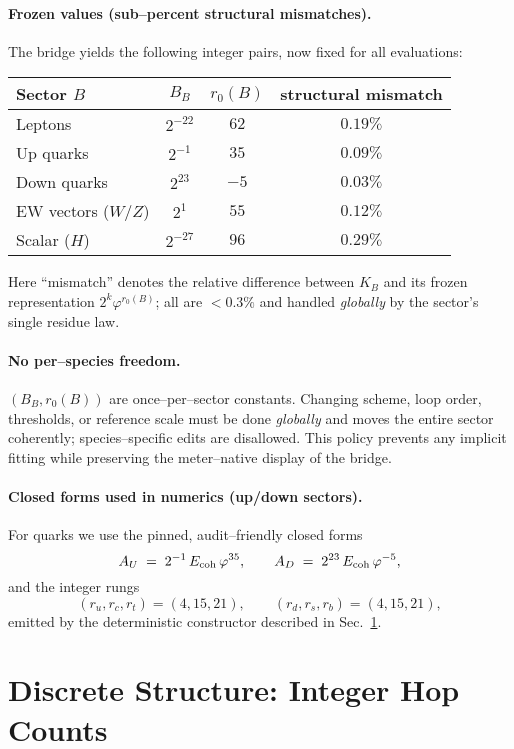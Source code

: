 \documentclass[epjc3]{svjour3}
\begin{document}
\paragraph{Frozen values (sub–percent structural mismatches).}
The bridge yields the following integer pairs, now fixed for all evaluations:
\begin{center}
\begin{tabular}{lccc}
\hline
Sector $B$ & $B_B$ & $r_0(B)$ & structural mismatch \\
\hline
Leptons        & $2^{-22}$ & $62$ & $0.19\%$ \\
Up quarks      & $2^{-1}$  & $35$ & $0.09\%$ \\
Down quarks    & $2^{23}$  & $-5$ & $0.03\%$ \\
EW vectors ($W/Z$) & $2^{1}$   & $55$ & $0.12\%$ \\
Scalar ($H$)   & $2^{-27}$ & $96$ & $0.29\%$ \\
\hline
\end{tabular}
\end{center}
Here “mismatch” denotes the relative difference between $K_B$ and its frozen representation $2^k\varphi^{r_0(B)}$; all are $<0.3\%$ and handled \emph{globally} by the sector’s single residue law.

\paragraph{No per–species freedom.}
$(B_B,r_0(B))$ are once–per–sector constants. Changing scheme, loop order, thresholds, or reference scale must be done \emph{globally} and moves the entire sector coherently; species–specific edits are disallowed. This policy prevents any implicit fitting while preserving the meter–native display of the bridge.

\paragraph{Closed forms used in numerics (up/down sectors).}
For quarks we use the pinned, audit–friendly closed forms
\[
 A_U \;=\; 2^{-1}\,E_{\rm coh}\,\varphi^{35},\qquad
 A_D \;=\; 2^{23}\,E_{\rm coh}\,\varphi^{-5},
\]
and the integer rungs
\[
 (r_u,r_c,r_t)=(4,15,21),\qquad (r_d,r_s,r_b)=(4,15,21),
\]
emitted by the deterministic constructor described in Sec.~\ref{sec:discrete-structure}.

\section{Discrete Structure: Integer Hop Counts}\label{sec:discrete-structure}
\end{document}
